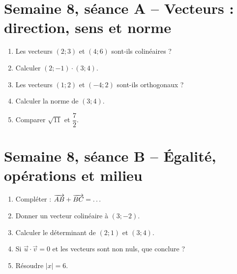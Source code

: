 \section{Semaine 8, séance A -- Vecteurs : direction, sens et norme}
\begin{enumerate}
  \item Les vecteurs $(2;3)$ et $(4;6)$ sont-ils colinéaires ?
  \item Calculer $(2;-1)\cdot(3;4)$.
  \item Les vecteurs $(1;2)$ et $(-4;2)$ sont-ils orthogonaux ?
  \item Calculer la norme de $(3;4)$.
  \item Comparer $\sqrt{11}$ et $\dfrac72$.
\end{enumerate}

\section{Semaine 8, séance B -- Égalité, opérations et milieu}
\begin{enumerate}
  \item Compléter : $\overrightarrow{AB}+\overrightarrow{BC}=\ldots$
  \item Donner un vecteur colinéaire à $(3;-2)$.
  \item Calculer le déterminant de $(2;1)$ et $(3;4)$.
  \item Si $\vec u\cdot\vec v=0$ et les vecteurs sont non nuls, que conclure ?
  \item Résoudre $|x|=6$.
\end{enumerate}

